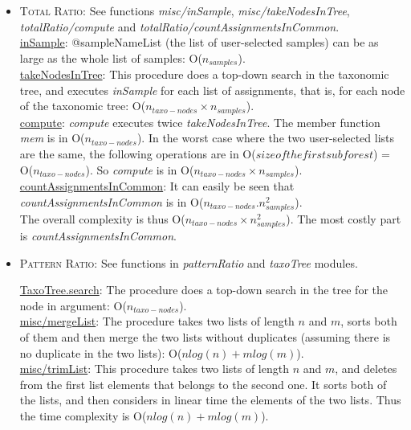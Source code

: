 \documentclass{report}
\begin{document}
\begin{itemize}
\item \textsc{Total Ratio:} See functions \emph{misc/inSample}, \emph{misc/takeNodesInTree}, \emph{totalRatio/compute} and \emph{totalRatio/countAssignmentsInCommon}.\\

\uline{inSample}: @sampleNameList (the list of user-selected samples) can be as large as the whole list of samples: O($n_{samples}$).\\

\uline{takeNodesInTree}: This procedure does a top-down search in the taxonomic tree, and executes \emph{inSample} for each list of assignments, that is, for each node of the taxonomic tree: O($n_{taxo-nodes} \times n_{samples}$).\\

\uline{compute}: \emph{compute} executes twice \emph{takeNodesInTree}. The member function \emph{mem} is in O($n_{taxo-nodes}$). In the worst case where the two user-selected lists are the same, the following operations are in O($size of the first subforest$) = O($n_{taxo-nodes}$). So \emph{compute} is in O($n_{taxo-nodes} \times n_{samples}$).\\

\uline{countAssignmentsInCommon}: It can easily be seen that \emph{countAssignmentsInCommon} is in O($n_{taxo-nodes}.n_{samples}^{2}$).\\

The overall complexity is thus O($n_{taxo-nodes} \times n_{samples}^{2}$). The most costly part is \emph{countAssignmentsInCommon}.

\item \textsc{Pattern Ratio:} See functions in \emph{patternRatio} and \emph{taxoTree} modules.

\uline{TaxoTree.search}: The procedure does a top-down search in the tree for the node in argument: O($n_{taxo-nodes}$).\\

\uline{misc/mergeList}: The procedure takes two lists of length $n$ and $m$, sorts both of them and then merge the two lists without duplicates (assuming there is no duplicate in the two lists): O($nlog(n) + mlog(m)$).\\

\uline{misc/trimList}: This procedure takes two lists of length $n$ and $m$, and deletes from the first list elements that belongs to the second one. It sorts both of the lists, and then considers in linear time the elements of the two lists. Thus the time complexity is O($nlog(n) + mlog(m)$).\\


\end{itemize}
\end{document}
